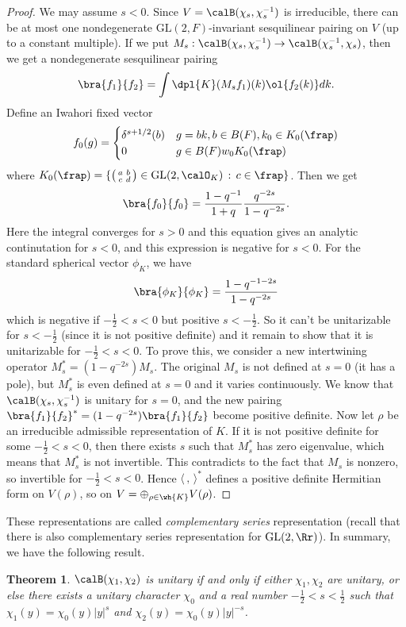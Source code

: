 \documentclass{article}
\newtheorem{theorem}{Theorem}[section]
\newcommand{\GL}{\mathrm{GL}}
\newcommand{\smat}[4]{\left(\begin{smallmatrix} #1 & #2 \\ #3 & #4 \end{smallmatrix}\right)}
\begin{document}
\begin{proof}
We may assume $s<0$. Since $V = \calB(\chi_s, \chi_s^{-1})$ is irreducible, there can be at most one nondegenerate $\GL(2, F)$-invariant sesquilinear pairing on $V$ (up to a constant multiple). 
If we put $M_{s}: \calB(\chi_s, \chi_s^{-1})\to \calB(\chi_s^{-1}, \chi_s)$, then we get a nondegenerate sesquilinear pairing
$$
\bra{f_1}{f_2} = \int\dpl{K} (M_s f_1)(k) \ol{f_{2}(k)} dk. 
$$
Define an Iwahori fixed vector 
$$
f_{0}(g) = \begin{cases} \delta^{s+1/2}(b) & g = bk, b\in B(F), k_{0} \in K_{0}(\frap) \\ 0 & g \in B(F)w_{0}K_{0}(\frap) \end{cases}
$$
where $K_{0}(\frap) = \{ \smat{a}{b}{c}{d}\in \GL(2 ,\calO_{K})\,:\, c\in \frap\}$. 
Then we get
$$
\bra{f_0}{f_0} = \frac{1-q^{-1}}{1+q} \frac{q^{-2s}}{1-q^{-2s}}.
$$
Here the integral converges for $s>0$ and this equation gives an analytic continutation for $s<0$, and this expression is negative for $s<0$. 
For the standard spherical vector $\phi_K$, we have
$$
\bra{\phi_K}{\phi_K} = \frac{1-q^{-1-2s}}{1-q^{-2s}}
$$
which is negative if $-\frac{1}{2} < s < 0$ but positive $s<-\frac{1}{2}$. 
So it can't be unitarizable for $s< -\frac{1}{2}$ (since it is not positive definite) and it remain to show that it is unitarizable for $-\frac{1}{2} < s< 0$. 
To prove this, we consider a new intertwining operator $M_{s}^{*} = (1-q^{-2s})M_{s}$. 
The original $M_{s}$ is not defined at $s = 0$ (it has a pole), but $M_{s}^{*}$ is even defined at $s = 0$ and it varies continuously. 
We know that $\calB(\chi_s, \chi_s^{-1})$ is unitary for $s = 0$, and the new pairing $\bra{f_1}{f_2}^{*} = (1-q^{-2s})\bra{f_1}{f_2}$ become positive definite. 
Now let $\rho$ be an irreducible admissible representation of $K$. 
If it is not positive definite for some $-\frac{1}{2} <s < 0$, then there exists $s$ such that $M_{s}^{*}$ has zero eigenvalue, which means that $M_{s}^{*}$ is not invertible. This contradicts to the fact that $M_{s}$ is nonzero, so invertible for $-\frac{1}{2} <s < 0$. 
Hence $\langle \,,\,\rangle^{*}$ defines a positive definite Hermitian form on $V(\rho)$, so on $V = \oplus_{\rho \in \wh{K}} V(\rho)$. 
\end{proof}
These representations are called \emph{complementary series} representation (recall that there is also complementary series representation for $\GL(2, \Rr)$). In summary, we have the following result. 
\begin{theorem}
$\calB(\chi_1, \chi_2)$ is unitary if and only if either $\chi_1, \chi_2$ are unitary, or else there exists a unitary character $\chi_0$ and a real number $-\frac{1}{2} < s < \frac{1}{2}$ such that $\chi_1(y) = \chi_0(y)|y|^{s}$ and $\chi_2(y) = \chi_0(y) |y|^{-s}$. 
\end{theorem}
\end{document}

